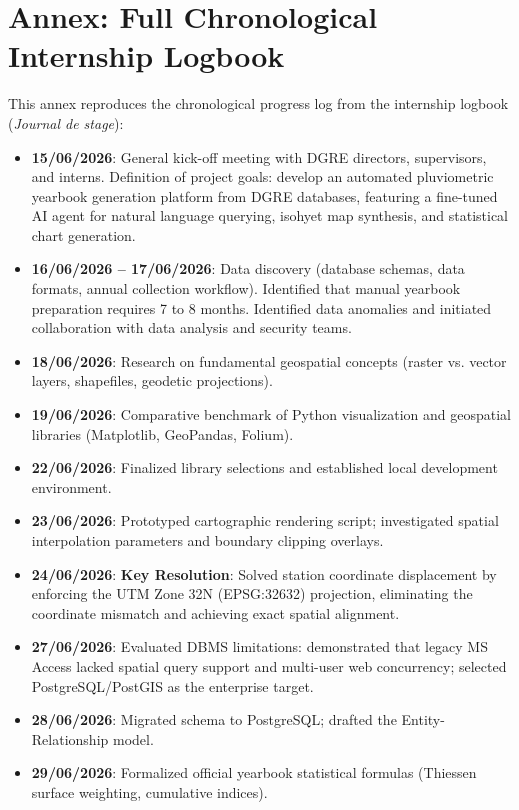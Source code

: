 \documentclass[12pt,a4paper]{report}
\begin{document}
\chapter{Annex: Full Chronological Internship Logbook}
\label{appendix:journal}

This annex reproduces the chronological progress log from the internship logbook (\textit{Journal de stage}):

\begin{itemize}[leftmargin=*]
  \item \textbf{15/06/2026}: General kick-off meeting with DGRE directors, supervisors, and interns. Definition of project goals: develop an automated pluviometric yearbook generation platform from DGRE databases, featuring a fine-tuned AI agent for natural language querying, isohyet map synthesis, and statistical chart generation.
  \item \textbf{16/06/2026 -- 17/06/2026}: Data discovery (database schemas, data formats, annual collection workflow). Identified that manual yearbook preparation requires 7 to 8 months. Identified data anomalies and initiated collaboration with data analysis and security teams.
  \item \textbf{18/06/2026}: Research on fundamental geospatial concepts (raster vs. vector layers, shapefiles, geodetic projections).
  \item \textbf{19/06/2026}: Comparative benchmark of Python visualization and geospatial libraries (Matplotlib, GeoPandas, Folium).
  \item \textbf{22/06/2026}: Finalized library selections and established local development environment.
  \item \textbf{23/06/2026}: Prototyped cartographic rendering script; investigated spatial interpolation parameters and boundary clipping overlays.
  \item \textbf{24/06/2026}: \textbf{Key Resolution}: Solved station coordinate displacement by enforcing the UTM Zone 32N (EPSG:32632) projection, eliminating the coordinate mismatch and achieving exact spatial alignment.
  \item \textbf{27/06/2026}: Evaluated DBMS limitations: demonstrated that legacy MS Access lacked spatial query support and multi-user web concurrency; selected PostgreSQL/PostGIS as the enterprise target.
  \item \textbf{28/06/2026}: Migrated schema to PostgreSQL; drafted the Entity-Relationship model.
  \item \textbf{29/06/2026}: Formalized official yearbook statistical formulas (Thiessen surface weighting, cumulative indices).

\end{itemize}
\end{document}
